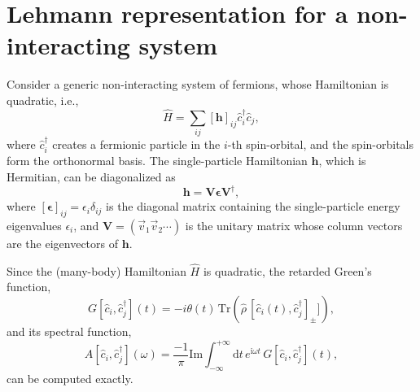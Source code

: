 \documentclass[11pt,a4paper,oneside]{article}
\begin{document}
\section*{Lehmann representation for a non-interacting system}

Consider a generic non-interacting system of fermions, whose Hamiltonian is quadratic, i.e.,
\begin{equation}
\hat{H} = \sum_{ij} [ \boldsymbol{h} ]_{ij} \hat{c}_{i}^\dagger \hat{c}_{j} ,
\end{equation}
where $\hat{c}_{i}^\dagger$ creates a fermionic particle in the $i$-th spin-orbital, and the spin-orbitals form the orthonormal basis.
The single-particle Hamiltonian $\boldsymbol{h}$, which is Hermitian, can be diagonalized as
\begin{equation}
\boldsymbol{h} = \boldsymbol{V} \boldsymbol{\epsilon} \boldsymbol{V}^\dagger,
\label{eq:eig_h}
\end{equation}
where $[\boldsymbol{\epsilon}]_{ij} = \epsilon_i \delta_{ij}$ is the diagonal matrix containing the single-particle energy eigenvalues $\epsilon_i$,
and $\boldsymbol{V} = ( \vec{v}_1 \vec{v}_2 \cdots )$ is the unitary matrix whose column vectors are the eigenvectors of $\boldsymbol{h}$.

Since the (many-body) Hamiltonian $\hat{H}$ is quadratic, the retarded Green's function,
\begin{equation}
G[\hat{c}_i, \hat{c}_j^\dagger] (t) = -i \theta (t) \, \mathrm{Tr}\!\left( \hat{\rho} \, [ \hat{c}_i (t), \hat{c}_j^\dagger ]_\pm ] \right),
\end{equation}
and its spectral function,
\begin{equation}
A[\hat{c}_i, \hat{c}_j^\dagger] (\omega) = \frac{-1}{\pi} \mathrm{Im} \int_{-\infty}^{+\infty} \mathrm{d}t \, e^{\mathrm{i} \omega t} \, G[\hat{c}_i, \hat{c}_j^\dagger] (t),
\end{equation}
can be computed exactly.
\end{document}
